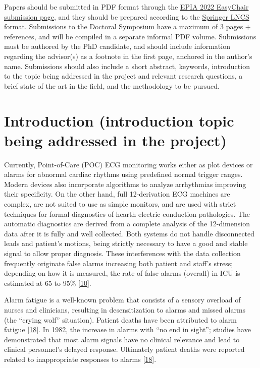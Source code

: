 \documentclass[runningheads]{llncs}
\begin{document}
Papers should be submitted in PDF format through the
\href{https://easychair.org/conferences/?conf=epia2022}{EPIA 2022 EasyChair submission page}, and they
should be prepared according to the
\href{http://www.springer.com/gp/computer-science/lncs/conference-proceedings-guidelines}{Springer LNCS}
format. Submissions to the Doctoral Symposium have a maximum of 3 pages + references, and will be
compiled in a separate informal PDF volume. Submissions must be authored by the PhD candidate, and
should include information regarding the advisor(s) as a footnote in the first page, anchored in the
author's name. Submissions should also include a short abstract, keywords, introduction to the
topic being addressed in the project and relevant research questions, a brief state of the art in
the field, and the methodology to be pursued.

\hypertarget{introduction-introduction-topic-being-addressed-in-the-project}{%
\section{Introduction (introduction topic being addressed in the project)}\label{introduction-introduction-topic-being-addressed-in-the-project}}

Currently, Point-of-Care (POC) ECG monitoring works either as plot devices or alarms for abnormal
cardiac rhythms using predefined normal trigger ranges. Modern devices also incorporate algorithms
to analyze arrhythmias improving their specificity. On the other hand, full 12-derivation ECG
machines are complex, are not suited to use as simple monitors, and are used with strict techniques
for formal diagnostics of hearth electric conduction pathologies. The automatic diagnostics are
derived from a complete analysis of the 12-dimension data after it is fully and well collected. Both
systems do not handle disconnected leads and patient's motions, being strictly necessary to have a
good and stable signal to allow proper diagnosis. These interferences with the data collection
frequently originate false alarms increasing both patient and staff's stress; depending on how it is
measured, the rate of false alarms (overall) in ICU is estimated at 65 to 95\% {[}\protect\hyperlink{ref-donchin2002}{10}{]}.

Alarm fatigue is a well-known problem that consists of a sensory overload of nurses and clinicians,
resulting in desensitization to alarms and missed alarms (the ``crying wolf'' situation). Patient
deaths have been attributed to alarm fatigue {[}\protect\hyperlink{ref-sendelbach2013}{18}{]}. In 1982, the increase in alarms with
``no end in sight''; studies have demonstrated that most alarm signals have no clinical relevance and
lead to clinical personnel's delayed response. Ultimately patient deaths were reported related to
inappropriate responses to alarms {[}\protect\hyperlink{ref-sendelbach2013}{18}{]}.
\end{document}
